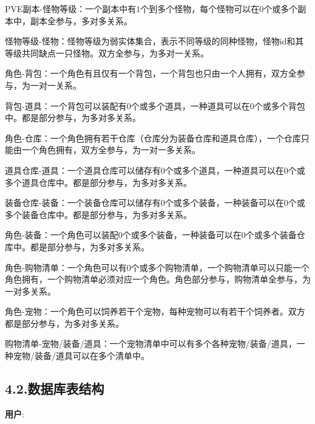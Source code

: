 \documentclass{article}
\begin{document}
PVE副本-怪物等级：一个副本中有1个到多个怪物，每个怪物可以在0个或多个副本中，副本全参与，多对多关系。%

怪物等级-怪物：怪物等级为弱实体集合，表示不同等级的同种怪物，怪物id和其等级共同缺点一只怪物。双方全参与，为多对一关系。%

角色-背包：一个角色有且仅有一个背包，一个背包也只由一个人拥有，双方全参与，为一对一关系。%

背包-道具：一个背包可以装配有0个或多个道具，一种道具可以在0个或多个背包中。都是部分参与，为多对多关系。%

角色-仓库：一个角色拥有若干仓库（仓库分为装备仓库和道具仓库），一个仓库只能由一个角色拥有，双方全参与，为一对一多关系。%

道具仓库-道具：一个道具仓库可以储存有0个或多个道具，一种道具可以在0个或多个道具仓库中。都是部分参与，为多对多关系。%

装备仓库-装备：一个装备仓库可以储存有0个或多个装备，一种装备可以在0个或多个装备仓库中。都是部分参与，为多对多关系。%

角色-装备：一个角色可以装配0个或多个装备，一种装备可以在0个或多个装备仓库中。都是部分参与，为多对多关系。%

角色-购物清单：一个角色可以有0个或多个购物清单，一个购物清单可以只能一个角色拥有，一个购物清单必须对应一个角色。角色部分参与，购物清单全参与，为一对多关系。%

角色-宠物：一个角色可以饲养若干个宠物，每种宠物可以有若干个饲养者。双方都是部分参与，为多对多关系。%

购物清单-宠物/装备/道具：一个宠物清单中可以有多个各种宠物/装备/道具，一种宠物/装备/道具可以在多个清单中。%

\subsection{4.2.\hspace*{0.5em}数据库表结构}\label{42}%

\noindent{}\textbf{用户}: %
\end{document}
